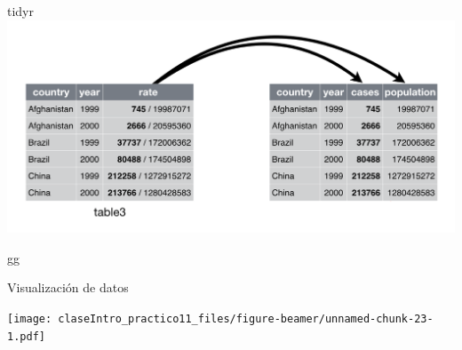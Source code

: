 \documentclass[ignorenonframetext,]{beamer}
\begin{document}
\begin{frame}[fragile]{tidyr}
\includegraphics{tidy-17.png}

\end{frame}

\begin{frame}{gg}
\protect\hypertarget{gg}{}


\end{frame}

\begin{frame}{Visualización de datos}
\protect\hypertarget{visualizaciuxf3n-de-datos}{}

\texttt{[image: claseIntro\_practico11\_files/figure-beamer/unnamed-chunk-23-1.pdf]}

\end{frame}
\end{document}
